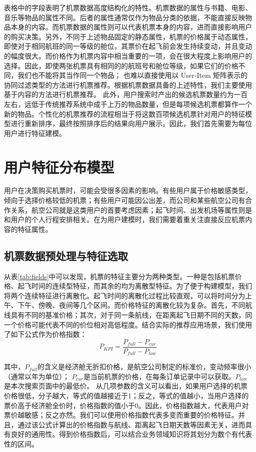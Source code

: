 表格中的字段表明了机票数据高度结构化的特性。机票数据的属性与书籍、电影、音乐等物品的属性不同。后者的属性通常仅作为物品分类的依据，不能直接反映物品本身的内容。而机票数据的属性则可以代表机票本身的内容，进而直接影响用户的购买决策。另外，不同于上述物品固定的静态属性，机票的价格属于动态属性，即使对于相同航班的同一等级的舱位，其票价在起飞前会发生持续变动，并且变动的幅度很大。而价格作为机票内容中相当重要的一项，会在很大程度上影响用户的选择。因此，即使两张机票具有相同的的航班号和舱位等级，如果它们的价格不同，我们也不能将其当作同一个物品；
也难以直接使用以 User-Item 矩阵表示的协同过滤类型的方法进行机票推荐。根据机票数据具备的上述特性，我们主要使用基于内容的方法进行机票推荐。
此外，用户搜索时产出的候选机票数量约为一百左右，远低于传统推荐系统中成千上万的物品数量，但是每项候选机票都算作一个新的物品。个性化的机票推荐的流程相当于将这数百项候选机票针对用户的特征模型进行重新排序，最终按照排序后的结果向用户展示。因此，我们首先需要为每位用户进行特征建模。

\section{用户特征分布模型}

用户在决策购买机票时，可能会受很多因素的影响。有些用户属于价格敏感类型，倾向于选择价格较低的机票；有些用户可能因公出差，而公司和某些航空公司有合作关系，航空公司就是这类用户的首要考虑因素；起飞时间、出发机场等属性则是和用户的个人行程安排相关。在为用户建模时，我们需要着重关注直接反应机票内容的特征属性。

\subsection{机票数据预处理与特征选取}

从表\ref{tab:fields}中可以发现，机票的特征主要分为两种类型。一种是包括机票价格、起飞时间的连续型特征，而其余的均为离散型特征。为了便于构建模型，我们将两个连续特征进行离散化。起飞时间的离散化过程比较直观，可以将时间分为上午、下午、傍晚、夜间等几个区间。而价格特征的离散化较为复杂。首先，不同航线具有不同的基准价格；其次，对于同一条航线，在距离起飞日期不同的天数，同一个价格可能代表不同的价位相对高低程度。结合实际的推荐应用场景，我们使用了如下公式作为价格指数：
\begin{equation}
	P_{KPI} = \frac{P_{full} - P_{cur}}{P_{full} - P_{low}}
\end{equation}

其中，$P_{full}$的含义是经济舱无折扣价格，是航空公司制定的标准价，变动频率很小（通常以年为单位）；
$P_{cur}$是当前机票的价格，在每条订单记录中可以获取。$P_{low}$是本次搜索页面中的最低价。
从几项参数的含义可以看出，如果用户选择的机票价格很低，分子越大，等式的值越接近于1；反之，等式的值越小，当用户选择的票价高于经济舱全价时，价格指数的值小于0。因此，价格指数越大，代表用户对票价越敏感；反之亦然。我们可以使用价格指数代表多变而重要的价格特征。并且，通过该公式计算出的价格指数与航线、距离起飞日期天数等因素无关，进而具有良好的通用性。得到价格指数后，可以结合业务领域知识将其划分为数个有代表性的区间。

